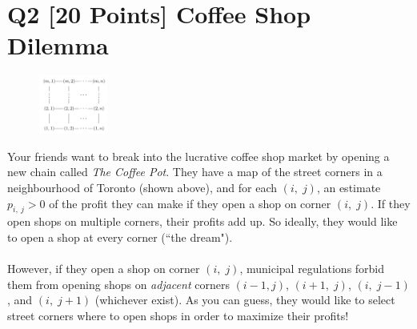\documentclass[10pt]{article}
\begin{document}
\section*{Q2 [20 Points] Coffee Shop Dilemma}
\begin{figure}[h]
    \centering
    \includegraphics[width=0.2\textwidth]{A4_1.png}
\end{figure}
Your friends want to break into the lucrative coffee shop market by opening a new chain called \textit{The Coffee Pot}. They have a map of the street corners in a neighbourhood of Toronto (shown above), and for each $(i, \; j)$, an estimate $p_{i, \: j} > 0$ of the profit they can make if they open a shop on corner $(i, \; j)$. If they open shops on multiple corners, their profits add up. So ideally, they would like to open a shop at every corner (``the dream").\\
\\
However, if they open a shop on corner $(i, \; j)$, municipal regulations forbid them from opening shops on \textit{adjacent} corners $(i - 1, j)$, $(i + 1, \; j)$, $(i, \; j - 1)$, and $(i, \; j + 1)$ (whichever exist). As you can guess, they would like to select street corners where to open shops in order to maximize their profits!
\end{document}
